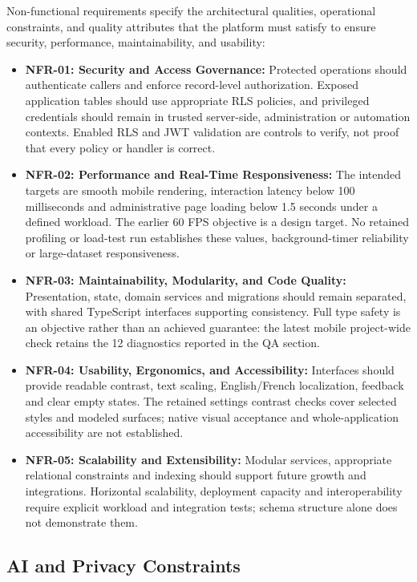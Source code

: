 \documentclass[12pt,a4paper,openany]{report}
\begin{document}
Non-functional requirements specify the architectural qualities, operational constraints, and quality attributes that the platform must satisfy to ensure security, performance, maintainability, and usability:

\begin{itemize}
    \item \textbf{NFR-01: Security and Access Governance:} Protected operations should authenticate callers and enforce record-level authorization. Exposed application tables should use appropriate RLS policies, and privileged credentials should remain in trusted server-side, administration or automation contexts. Enabled RLS and JWT validation are controls to verify, not proof that every policy or handler is correct.
    \item \textbf{NFR-02: Performance and Real-Time Responsiveness:} The intended targets are smooth mobile rendering, interaction latency below 100 milliseconds and administrative page loading below 1.5 seconds under a defined workload. The earlier 60 FPS objective is a design target. No retained profiling or load-test run establishes these values, background-timer reliability or large-dataset responsiveness.
    \item \textbf{NFR-03: Maintainability, Modularity, and Code Quality:} Presentation, state, domain services and migrations should remain separated, with shared TypeScript interfaces supporting consistency. Full type safety is an objective rather than an achieved guarantee: the latest mobile project-wide check retains the 12 diagnostics reported in the QA section.
    \item \textbf{NFR-04: Usability, Ergonomics, and Accessibility:} Interfaces should provide readable contrast, text scaling, English/French localization, feedback and clear empty states. The retained settings contrast checks cover selected styles and modeled surfaces; native visual acceptance and whole-application accessibility are not established.
    \item \textbf{NFR-05: Scalability and Extensibility:} Modular services, appropriate relational constraints and indexing should support future growth and integrations. Horizontal scalability, deployment capacity and interoperability require explicit workload and integration tests; schema structure alone does not demonstrate them.
\end{itemize}

\subsection{AI and Privacy Constraints}
\end{document}
